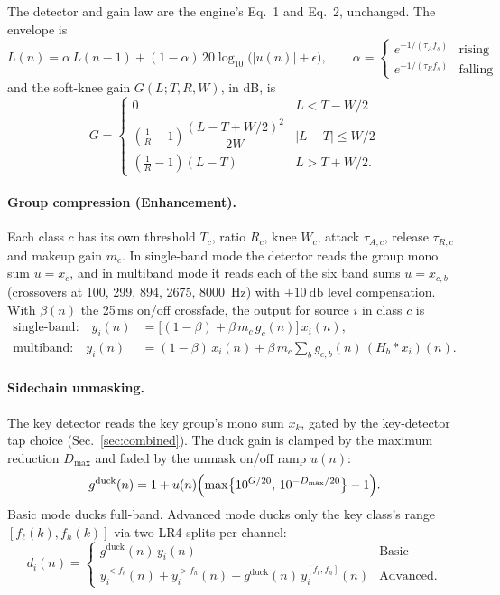 \documentclass[11pt]{article}
\begin{document}
The detector and gain law are the engine's Eq.~1 and Eq.~2, unchanged. The
envelope is
\begin{equation}
  L(n) = \alpha\,L(n-1) + (1-\alpha)\,20\log_{10}\!\bigl(|u(n)|+\epsilon\bigr),
  \qquad
  \alpha = \begin{cases} e^{-1/(\tau_A f_s)} & \text{rising}\\ e^{-1/(\tau_R f_s)} & \text{falling}\end{cases}
\end{equation}
and the soft-knee gain $G(L; T, R, W)$, in dB, is
\begin{equation}
  G = \begin{cases}
   0 & L < T - W/2\\
   \left(\tfrac{1}{R}-1\right)\dfrac{(L-T+W/2)^2}{2W} & |L-T|\le W/2\\
   \left(\tfrac{1}{R}-1\right)(L-T) & L > T + W/2.
  \end{cases}
\end{equation}

\paragraph{Group compression (Enhancement).}
Each class $c$ has its own threshold $T_c$, ratio $R_c$, knee $W_c$,
attack $\tau_{A,c}$, release $\tau_{R,c}$ and makeup gain $m_c$. In single-band mode the detector reads the group mono
sum $u=x_c$, and in multiband mode it reads each of the six band sums
$u=x_{c,b}$ (crossovers at 100, 299, 894, 2675, \SI{8000}{\hertz}) with
$+\SI{10}{\decibel}$ level compensation. With $\beta(n)$ the 25\,ms on/off
crossfade, the output for source $i$ in class $c$ is
\begin{align}
  \text{single-band:}\quad y_i(n) &= \bigl[(1-\beta) + \beta\, m_c\, g_c(n)\bigr]\, x_i(n), \label{eq:enh}\\
  \text{multiband:}\quad y_i(n) &= (1-\beta)\,x_i(n) + \beta\, m_c \textstyle\sum_b g_{c,b}(n)\,(H_b * x_i)(n). \nonumber
\end{align}

\paragraph{Sidechain unmasking.}
The key detector reads the key group's mono sum $x_k$, gated by the
key-detector tap choice (Sec.~\ref{sec:combined}). The duck gain is clamped
by the maximum reduction $D_{\max}$ and faded by the unmask on/off ramp
$u(n)$:
\begin{equation}
  g^{\mathrm{duck}}(n) = 1 + u(n)\Bigl(\max\bigl\{10^{G/20},\,10^{-D_{\max}/20}\bigr\} - 1\Bigr).
\end{equation}
Basic mode ducks full-band. Advanced mode ducks only the key class's range
$[f_\ell(k), f_h(k)]$ via two LR4 splits per channel:
\begin{equation}
  d_i(n) = \begin{cases}
   g^{\mathrm{duck}}(n)\,y_i(n) & \text{Basic}\\
   y_i^{<f_\ell}(n) + y_i^{>f_h}(n) + g^{\mathrm{duck}}(n)\,y_i^{[f_\ell,f_h]}(n) & \text{Advanced.}
  \end{cases}
\end{equation}
\end{document}
